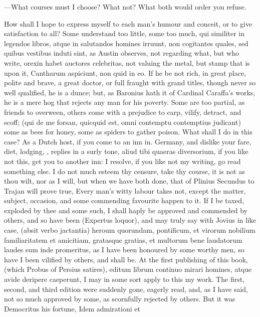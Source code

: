 {---What courses must I choose?
What not? What both would order you refuse.

How shall I hope to express myself to each man's humour and
conceit, or to give satisfaction to all? Some understand too
little, some too much, qui similiter in legendos libros, atque in
salutandos homines irruunt, non cogitantes quales, sed quibus vestibus
induti sint, as Austin observes, not regarding what, but who
write, orexin habet auctores celebritas, not valuing the metal,
but stamp that is upon it, Cantharum aspiciunt, non quid in eo. If he
be not rich, in great place, polite and brave, a great doctor, or full
fraught with grand titles, though never so well qualified, he is a
dunce; but, as Baronius hath it of Cardinal Caraffa's works, he is
a mere hog that rejects any man for his poverty. Some are too partial,
as friends to overween, others come with a prejudice to carp, vilify,
detract, and scoff; (qui de me forsan, quicquid est, omni contemptu
contemptius judicant) some as bees for honey, some as spiders to gather
poison. What shall I do in this case? As a Dutch host, if you come to
an inn in. Germany, and dislike your fare, diet, lodging, \etc, replies
in a surly tone, aliud tibi quaeras diversorium, if you like not
this, get you to another inn: I resolve, if you like not my writing, go
read something else. I do not much esteem thy censure, take thy course,
it is not as thou wilt, nor as I will, but when we have both done, that
of Plinius Secundus to Trajan will prove true, Every man's witty
labour takes not, except the matter, subject, occasion, and some
commending favourite happen to it. If I be taxed, exploded by thee and
some such, I shall haply be approved and commended by others, and so
have been (Expertus loquor), and may truly say with Jovius in like
case, (absit verbo jactantia) heroum quorundam, pontificum, et virorum
nobilium familiaritatem et amicitiam, gratasque gratias, et multorum
 bene laudatorum laudes sum inde promeritus, as I have been
honoured by some worthy men, so have I been vilified by others, and
shall be. At the first publishing of this book, (which Probus of
Persius satires), editum librum continuo mirari homines, atque avide
deripere caeperunt, I may in some sort apply to this my work. The
first, second, and third edition were suddenly gone, eagerly read, and,
as I have said, not so much approved by some, as scornfully rejected by
others. But it was Democritus his fortune, Idem admirationi et
}
